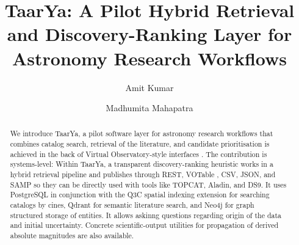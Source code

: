 \documentclass[12pt]{elsarticle}
\begin{document}
\begin{frontmatter}

\title{TaarYa: A Pilot Hybrid Retrieval and Discovery-Ranking Layer for Astronomy Research Workflows}

\author[inst1]{Amit Kumar}
\author[inst1]{Madhumita Mahapatra}


\begin{abstract}
We introduce \textsf{TaarYa}, a pilot software layer for astronomy research workflows that combines catalog search, retrieval of the literature, and candidate prioritisation is achieved in the back of Virtual Observatory-style interfaces \citep{Hanisch2007}. The contribution is systems-level: Within \textsf{TaarYa}, a transparent discovery-ranking heuristic works in a hybrid retrieval pipeline and publishes through REST, VOTable \citep{Ochsenbein2013}, CSV, JSON, and SAMP so they can be directly used with tools like TOPCAT, Aladin, and DS9.  It uses PostgreSQL in conjunction with the Q3C spatial indexing extension for searching catalogs by cines, Qdrant for semantic literature search, and Neo4j for graph structured storage of entities. It allows askinng questions regarding origin of the data and initial uncertainty. Concrete scientific-output utilities for propagation of derived absolute magnitudes are also available.


\end{abstract}
\end{frontmatter}
\end{document}
